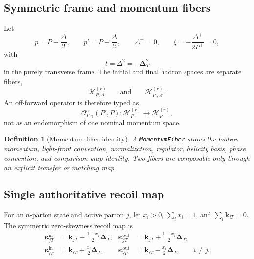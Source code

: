 \documentclass[11pt]{article}
\newtheorem{definition}{Definition}[section]
\newcommand{\DT}{\bm{\Delta}_{T}}
\newcommand{\Hil}{\mathcal H}
\newcommand{\cO}{\mathcal O}
\newcommand{\MomentumFiber}{\texttt{MomentumFiber}}
\begin{document}
\subsection{Symmetric frame and momentum fibers}

Let
\begin{equation}
 p=P-\frac{\Delta}{2},
 \qquad
 p'=P+\frac{\Delta}{2},
 \qquad
 \Delta^+=0,
 \qquad
 \xi=-\frac{\Delta^+}{2P^+}=0,
 \label{eq:symmetric-frame}
\end{equation}
with
\begin{equation}
 t=\Delta^2=-\DT^2
\end{equation}
in the purely transverse frame.  The initial and final hadron spaces are
separate fibers,
\begin{equation}
 \Hil_{P,\Lambda}^{(r)}
 \qquad\text{and}\qquad
 \Hil_{P',\Lambda'}^{(r)}.
\end{equation}
An off-forward operator is therefore typed as
\begin{equation}
 \cO_{\Gamma,\gamma}^{a}(P',P):
 \Hil_{P}^{(r)}\longrightarrow\Hil_{P'}^{(r)},
 \label{eq:operator-fiber-map}
\end{equation}
not as an endomorphism of one nominal momentum space.

\begin{definition}[Momentum-fiber identity]
A \MomentumFiber{} stores the hadron momentum, light-front convention,
normalization, regulator, helicity basis, phase convention, and comparison-map
identity.  Two fibers are composable only through an explicit transfer or
matching map.
\end{definition}

\subsection{Single authoritative recoil map}

For an \(n\)-parton state and active parton \(j\), let
\(x_i>0\), \(\sum_i x_i=1\), and \(\sum_i\bm k_{iT}=0\).  The symmetric
zero-skewness recoil map is
\begin{align}
 \bm\kappa_{jT}^{\mathrm{in}}
 &=\bm k_{jT}-\frac{1-x_j}{2}\DT,
 &
 \bm\kappa_{jT}^{\mathrm{out}}
 &=\bm k_{jT}+\frac{1-x_j}{2}\DT,
 \label{eq:active-recoil}\\
 \bm\kappa_{iT}^{\mathrm{in}}
 &=\bm k_{iT}+\frac{x_i}{2}\DT,
 &
 \bm\kappa_{iT}^{\mathrm{out}}
 &=\bm k_{iT}-\frac{x_i}{2}\DT,
 \qquad i\neq j.
 \label{eq:spectator-recoil}
\end{align}
\end{document}
